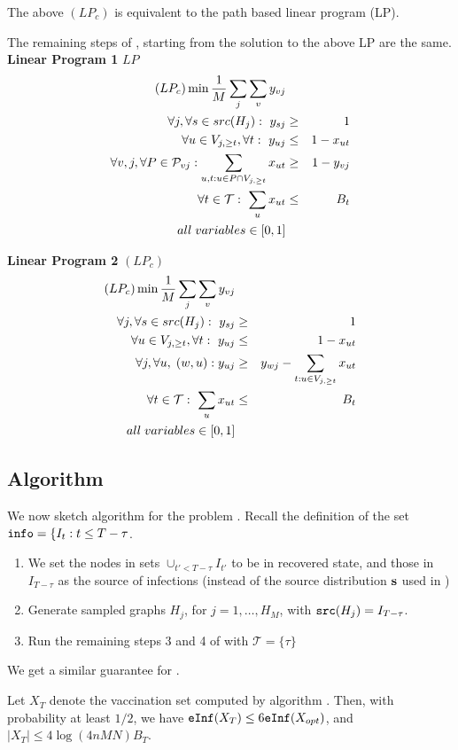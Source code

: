 \begin{lemma}
\label{lemma:alt-LP}
The above $(LP_c)$ is equivalent to the path based linear program (LP).
\end{lemma}

The remaining steps of \algo{}, starting from the solution to the above LP are the same.\\

\noindent
\textbf{Linear Program 1} $LP$
\begin{eqnarray*}
\centering
(LP_c) \min \frac{1}{M}\sum_j \sum_v y_{vj} &&\\
\forall j, \forall s \in src(H_j):\ y_{sj} &\geq& 1\\
\forall u \in V_{j, \geq t}, \forall t:\ y_{uj} &\leq& 1 - x_{ut} \\
\forall v, j, \forall P \in \mathcal{P}_{vj}: \sum_{u,t: u\in P\cap V_{j,\geq t}} x_{ut} &\geq& 1 - y_{vj}\\
\forall t\in\mathcal{T}:\ \sum_u x_{ut} &\leq& B_t\\
all \; variables \in [0,1]
\end{eqnarray*}

\noindent
\textbf{Linear Program 2}  $(LP_c)$
\begin{eqnarray*}
\centering
(LP_c) \min \frac{1}{M}\sum_j \sum_v y_{vj} &&\\
\forall j, \forall s \in src(H_j):\ y_{sj} &\geq& 1\\
\forall u \in V_{j, \geq t}, \forall t:\ y_{uj} &\leq& 1 - x_{ut} \\
\forall j, \forall u, \; (w, u): y_{uj} &\geq& y_{wj} - \sum_{t: u \in V_{j, \geq t}} x_{ut}\\
\forall t\in\mathcal{T}:\ \sum_u x_{ut} &\leq& B_t\\
all \; variables \in [0,1]
\end{eqnarray*}

\subsection{Algorithm \algodelay{}}
We now sketch algorithm \algodelay{} for the problem \probdelay{}. Recall the definition of the set $\texttt{info}=\{I_t: t\leq T-\tau$.
\begin{enumerate}
\item 
We set the nodes in sets $\cup_{t'<T-\tau} I_{t'}$ to be in recovered state, and those in $I_{T-\tau}$ as the source of infections (instead of the source distribution $\mathbf{s}$ used in \prob{})
\item
Generate sampled graphs $H_j$, for $j=1,\ldots,H_M$, with $\texttt{src}(H_j)=I_{T-\tau}$. 
\item 
Run the remaining steps 3 and 4 of \algo{} with $\mathcal{T}=\{\tau\}$
\end{enumerate}

We get a similar guarantee for \algodelay{}.
\begin{theorem}
\label{theorem:algodelay}
Let $X_T$ denote the vaccination set computed by algorithm \algodelay{}.
Then, with probability at least $1/2$, we have
$\texttt{eInf}(X_T)\leq 6\texttt{eInf}(X_{opt})$, and 
$|X_T|\leq 4\log(4nMN)B_T$.
\end{theorem}